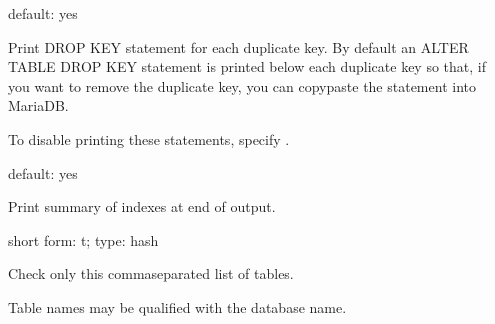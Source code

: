 \documentclass[letterpaper,10pt,english]{sphinxmanual}
\begin{document}
\begin{fulllineitems}
\label{\detokenize{mariadb-index-checker:cmdoption-mariadb-index-checker-no-sql}}
default: yes

Print DROP KEY statement for each duplicate key.  By default an ALTER TABLE
DROP KEY statement is printed below each duplicate key so that, if you want to
remove the duplicate key, you can copy\sphinxhyphen{}paste the statement into MariaDB.

To disable printing these statements, specify .

\end{fulllineitems}


\begin{fulllineitems}
\label{\detokenize{mariadb-index-checker:cmdoption-mariadb-index-checker-no-summary}}
default: yes

Print summary of indexes at end of output.

\end{fulllineitems}


\begin{fulllineitems}
\label{\detokenize{mariadb-index-checker:cmdoption-mariadb-index-checker-tables}}
short form: \sphinxhyphen{}t; type: hash

Check only this comma\sphinxhyphen{}separated list of tables.

Table names may be qualified with the database name.

\end{fulllineitems}
\end{document}
